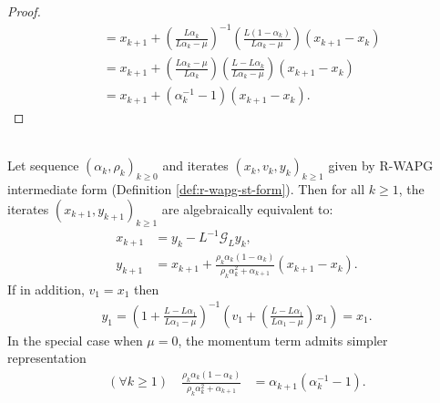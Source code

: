 \documentclass[12pt]{article}
\begin{document}
\begin{proof}
\begin{align*}
                &= 
                x_{k + 1} + \left(
                    \frac{L\alpha_k}{L\alpha_k - \mu}
                \right)^{-1}\left(
                    \frac{L(1 - \alpha_k)}{L\alpha_k - \mu}
                \right)(x_{k + 1} - x_k)
                \\
                &= 
                x_{k + 1} + \left(
                    \frac{L\alpha_k - \mu}{L\alpha_k}
                \right)\left(
                    \frac{L - L\alpha_k}{L\alpha_k - \mu}
                \right)(x_{k + 1} - x_k)
                \\
                &= x_{k + 1} + (\alpha_k^{-1} - 1)(x_{k + 1} - x_k). 
            \end{align*}
        \end{proof}
    
    \begin{proposition}\label{prop:r-wapg-momentum-repr}
        \;\\
        Let sequence $(\alpha_k, \rho_k)_{k \ge 0}$ and iterates $(x_k, v_k, y_k)_{k\ge 1}$ given by R-WAPG intermediate form (Definition \ref{def:r-wapg-st-form}). 
        Then for all $k \ge 1$, the iterates $(x_{k + 1}, y_{k + 1})_{k \ge 1}$ are algebraically equivalent to: 
        \begin{align*}
            x_{k + 1} &= y_k - L^{-1}\mathcal G_Ly_k, 
            \\
            y_{k + 1} &= 
            x_{k + 1} + 
            \frac{\rho_k\alpha_k(1 - \alpha_k)}
            {\rho_k\alpha_k^2 + \alpha_{k + 1}}(x_{k + 1} - x_k). 
        \end{align*}
        If in addition, $v_1 = x_1$ then 
        \begin{align*}
            y_1 = \left(
                1 + \frac{L - L \alpha_1}{L\alpha_1 - \mu}
            \right)^{-1}\left(
                v_1 + \left(
                    \frac{L - L \alpha_1}{L \alpha_1 - \mu}
                \right)x_1
            \right) = x_1. 
        \end{align*}
        In the special case when $\mu = 0$, the momentum term admits simpler representation 
        \begin{align*}
            (\forall k \ge 1) \quad 
            \frac{\rho_k\alpha_k(1 - \alpha_k)}{\rho_k\alpha_k^2 + \alpha_{k + 1}}
            & = \alpha_{k + 1}(\alpha_k^{-1} - 1). 
        \end{align*}
    \end{proposition}
\end{document}
